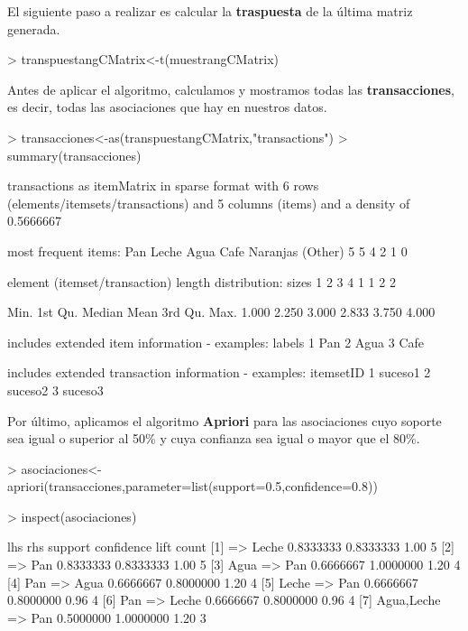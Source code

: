 \documentclass [a4paper] {article}
\begin{document}
{\bigskip
El siguiente paso a realizar es calcular la \textbf{traspuesta} de la última matriz generada.
\begin{Schunk}
\begin{Sinput}
> transpuestangCMatrix<-t(muestrangCMatrix)
\end{Sinput}
\end{Schunk}

\bigskip
Antes de aplicar el algoritmo, calculamos y mostramos todas las \textbf{transacciones}, es decir, todas las asociaciones
que hay en nuestros datos.
\begin{Schunk}
\begin{Sinput}
> transacciones<-as(transpuestangCMatrix,"transactions")
> summary(transacciones)
\end{Sinput}
\begin{Soutput}
transactions as itemMatrix in sparse format with
 6 rows (elements/itemsets/transactions) and
 5 columns (items) and a density of 0.5666667 

most frequent items:
     Pan    Leche     Agua     Cafe Naranjas  (Other) 
       5        5        4        2        1        0 

element (itemset/transaction) length distribution:
sizes
1 2 3 4 
1 1 2 2 

   Min. 1st Qu.  Median    Mean 3rd Qu.    Max. 
  1.000   2.250   3.000   2.833   3.750   4.000 

includes extended item information - examples:
  labels
1    Pan
2   Agua
3   Cafe

includes extended transaction information - examples:
  itemsetID
1   suceso1
2   suceso2
3   suceso3
\end{Soutput}
\end{Schunk}

\bigskip
Por último, aplicamos el algoritmo \textbf{Apriori} para las asociaciones cuyo soporte sea igual o superior al 50\% y cuya confianza
sea igual o mayor que el 80\%.
\begin{Schunk}
\begin{Sinput}
> asociaciones<-apriori(transacciones,parameter=list(support=0.5,confidence=0.8))
\end{Sinput}
\end{Schunk}
\begin{Schunk}
\begin{Sinput}
> inspect(asociaciones)
\end{Sinput}
\begin{Soutput}
    lhs             rhs     support   confidence lift count
[1] {}           => {Leche} 0.8333333 0.8333333  1.00 5    
[2] {}           => {Pan}   0.8333333 0.8333333  1.00 5    
[3] {Agua}       => {Pan}   0.6666667 1.0000000  1.20 4    
[4] {Pan}        => {Agua}  0.6666667 0.8000000  1.20 4    
[5] {Leche}      => {Pan}   0.6666667 0.8000000  0.96 4    
[6] {Pan}        => {Leche} 0.6666667 0.8000000  0.96 4    
[7] {Agua,Leche} => {Pan}   0.5000000 1.0000000  1.20 3    
\end{Soutput}
\end{Schunk}

}
\end{document}
